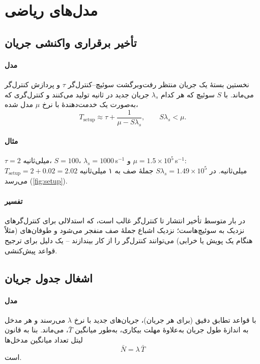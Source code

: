 \documentclass[11pt,a4paper]{article}
\begin{document}
\section{مدل‌های ریاضی}

\subsection{تأخیر برقراری واکنشی جریان}\label{sec:setup}
\paragraph{مدل} نخستین بستهٔ یک جریان منتظر رفت‌وبرگشت سوئیچ--کنترل‌گر $\tau$ و پردازش کنترل‌گر می‌ماند. با $S$ سوئیچ که هر
کدام $\lambda_s$ جریان جدید در ثانیه تولید می‌کنند و کنترل‌گری که به‌صورت یک خدمت‌دهندهٔ  با نرخ $\mu$ مدل شده،
\begin{equation}\label{eq:setup}
  T_{\mathrm{setup}} \approx \tau + \frac{1}{\mu - S\lambda_s}, \qquad S\lambda_s < \mu .
\end{equation}
\paragraph{مثال} $\tau = 2$ میلی‌ثانیه، $S = 100$، $\lambda_s = 1000$\,s$^{-1}$ و $\mu = 1.5\times10^5$\,s$^{-1}$:
$T_{\mathrm{setup}} = 2 + 0.02 = 2.02$ میلی‌ثانیه. در $S\lambda_s = 1.49\times10^5$ جملهٔ صف به ۱ میلی‌ثانیه می‌رسد
(\cref{fig:setup}).
\paragraph{تفسیر} در بار متوسط تأخیر انتشار تا کنترل‌گر غالب است، که استدلالی برای کنترل‌گرهای نزدیک به سوئیچ‌هاست؛ نزدیک
اشباع جملهٔ صف منفجر می‌شود و طوفان‌های  (مثلاً هنگام یک پویش یا خرابی) می‌توانند کنترل‌گر را از کار
بیندازند -- یک دلیل برای ترجیح قواعد پیش‌کنشی.

\begin{acnfigure}
  \caption{تأخیر صف کنترل‌گر بر حسب نرخ  (\cref{eq:setup}).}
  \label{fig:setup}
\end{acnfigure}

\subsection{اشغال جدول جریان}\label{sec:little}
\paragraph{مدل} با قواعد تطابق دقیق (برای هر جریان)، جریان‌های جدید با نرخ $\lambda$ می‌رسند و هر مدخل به اندازهٔ طول جریان
به‌علاوهٔ مهلت بیکاری، به‌طور میانگین $\bar T$، می‌ماند. بنا به قانون لیتل تعداد میانگین مدخل‌ها
\begin{equation}\label{eq:little}
  \bar N = \lambda\,\bar T
\end{equation}
است.
\end{document}
